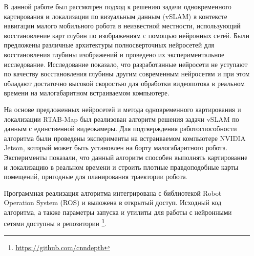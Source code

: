 \documentclass{mipt-thesis-bs}
\begin{document}
В данной работе был рассмотрен подход к решению задачи одновременного картирования и локализации по визуальным данным (vSLAM) в контексте навигации малого мобильного робота в неизвестной местности, использующий восстановление карт глубин по изображениям с помощью нейронных сетей. Были предложены различные архитектуры полносверточных нейросетей для восстановления глубины изображений и проведено их экспериментальное исследование. Исследование показало, что разработанные нейросети не уступают по качеству восстановления глубины другим современным нейросетям и при этом обладают достаточно высокой скоростью для обработки видеопотока в реальном времени на малогабаритном встраиваемом компьютере.

На основе предложенных нейросетей и метода одновременного картирования и локализации RTAB-Map был реализован алгоритм решения задачи vSLAM по данным с единственной видеокамеры. Для подтверждения работоспособности алгоритма были проведены эксперименты на встраиваемом компьютере NVIDIA Jetson, который может быть установлен на борту малогабаритного робота. Эксперименты показали, что данный алгоритм способен выполнять картирование и локализацию в реальном времени и строить плотные правдоподобные карты помещений, пригодные для планирования траектории робота.

Программная реализация алгоритма интегрирована с библиотекой Robot Operation System (ROS) и выложена в открытый доступ. Исходный код алгоритма, а также параметры запуска и утилиты для работы с нейронными сетями доступны в репозитории \footnote{\href{https://github.com/cnndepth}{https://github.com/cnndepth}}.

\backmatter
\printbib
\end{document}
